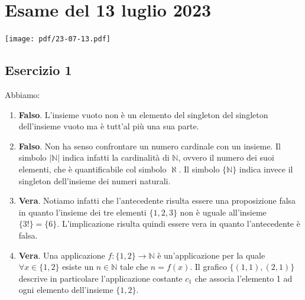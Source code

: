 \section{Esame del 13 luglio 2023}
\begin{center}
	\texttt{[image: pdf/23-07-13.pdf]}
\end{center}
\subsection*{Esercizio 1}
Abbiamo:
\begin{enumerate}[label=(\textit{\roman*})]
	\item \textbf{Falso}. L'insieme vuoto non è un elemento del singleton del singleton dell'insieme vuoto ma è tutt'al più una sua parte.
	\item \textbf{Falso}. Non ha senso confrontare un numero cardinale con un insieme. Il simbolo $|\mathbb{N}|$ indica infatti la cardinalità di $\mathbb{N}$, ovvero il numero dei suoi elementi, che è quantificabile col simbolo $\aleph$. Il simbolo $\{\mathbb{N}\}$ indica invece il singleton dell'insieme dei numeri naturali.
	\item \textbf{Vera}. Notiamo infatti che l'antecedente risulta essere una proposizione falsa in quanto l'insieme dei tre elementi $\{1,2,3\}$ non è uguale all'insieme $\{3!\}=\{6\}$. L'implicazione risulta quindi essere vera in quanto l'antecedente è falsa.
	\item \textbf{Vera}. Una applicazione $f: \{1,2\} \rightarrow \mathbb{N}$ è un'applicazione per la quale $\forall x \in \{1,2\}$  esiste un $n \in \mathbb{N}$ tale che $n=f(x)$. Il grafico $\{(1,1),(2,1)\}$ descrive in particolare l'applicazione costante $c_{1}$ che associa l'elemento 1 ad ogni elemento dell'insieme $\{1,2\}$.
\end{enumerate}
